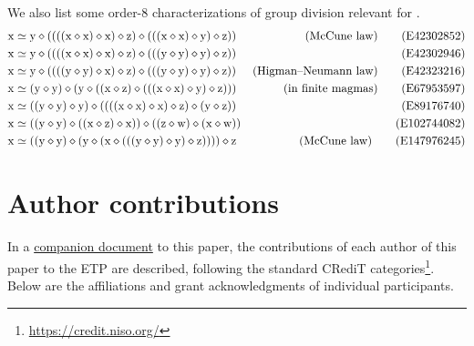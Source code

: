 \documentclass[12pt]{amsart}
\theoremstyle{definition}
\newcommand{\x}{\mathrm{x}}
\newcommand{\y}{\mathrm{y}}
\newcommand{\z}{\mathrm{z}}
\newcommand{\w}{\mathrm{w}}
\newcommand{\op}{\diamond}
\newcommand{\formaleq}{\simeq}
\begin{document}
We also list some order-$8$ characterizations of group division relevant for .
\begin{align}
        \x &\formaleq \y \op ((((\x \op \x) \op \x) \op \z) \op (((\x \op \x) \op \y) \op \z)) & \hbox{(McCune law)} \label{eq42302852}\tag{E42302852} \\
        \x &\formaleq \y \op ((((\x \op \x) \op \x) \op \z) \op (((\y \op \y) \op \y) \op \z)) & \label{eq42302946}\tag{E42302946} \\
        \x &\formaleq \y \op ((((\y \op \y) \op \x) \op \z) \op (((\y \op \y) \op \y) \op \z)) & \hbox{(Higman--Neumann law)} \label{eq42323216}\tag{E42323216} \\
        \x &\formaleq (\y \op \y) \op (\y \op ((\x \op \z) \op (((\x \op \x) \op \y) \op \z))) & \hbox{(in finite magmas)} \label{eq67953597}\tag{E67953597} \\
        \x &\formaleq ((\y \op \y) \op \y) \op ((((\x \op \x) \op \x) \op \z) \op (\y \op \z)) & \label{eq89176740}\tag{E89176740} \\
        \x &\formaleq ((\y \op \y) \op ((\x \op \z) \op \x)) \op ((\z \op \w) \op (\x \op \w)) & \label{eq102744082}\tag{E102744082} \\
        \x &\formaleq ((\y \op \y) \op (\y \op (\x \op (((\y \op \y) \op \y) \op \z)))) \op \z & \hbox{(McCune law)} \label{eq147976245}\tag{E147976245}
\end{align}
\endgroup

\section{Author contributions}

In a \href{https://github.com/teorth/equational_theories/blob/main/paper/contributions.md}{companion document} to this paper, the contributions of each author of this paper to the ETP are described, following the standard CRediT categories\footnote{\url{https://credit.niso.org/}}. Below are the affiliations and grant acknowledgments of individual participants.
\end{document}
